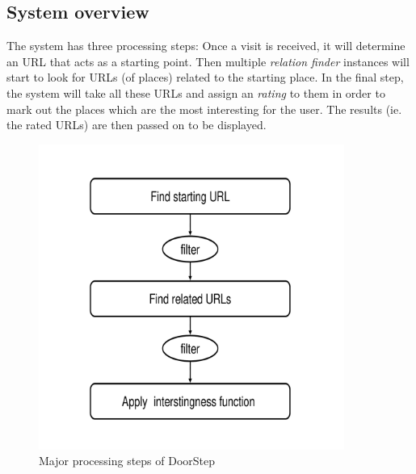 \documentclass[a4paper]{danarticle}
\begin{document}
    \subsection*{System overview}
      The system has three processing steps: Once a visit is received,
      it will determine an URL that acts as a starting point.
      Then multiple \textit{relation finder} instances will start to
      look for URLs (of places) related to the starting place. In
      the final step, the system will take all these URLs and assign an
      \textit{rating} to them in order to mark out the places
      which are the most interesting for the user. The results (ie. the
      rated URLs) are then passed on to be displayed.
      \begin{figure}[h]
        \centering
	\includegraphics[width=10cm]{steps_overview}
	\caption{Major processing steps of DoorStep}
	\label{steps_overview}
      \end{figure}
\end{document}
